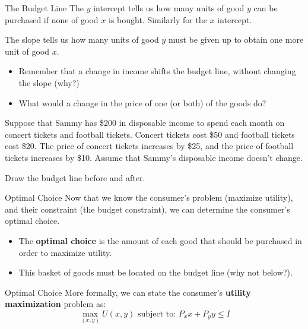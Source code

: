 \documentclass[11pt,t]{beamer}
\begin{document}
\begin{frame}{The Budget Line}
  The $y$ intercept tells us how many units of good $y$ can be purchased if none of good $x$ is bought. Similarly for the $x$ intercept.
  
  \pause\bigskip
  The slope tells us how many units of good $y$ must be given up to obtain one more unit of good $x$.

  \pause\bigskip
  \begin{itemize}
    \item Remember that a change in income shifts the budget line, without changing the slope (why?)
    
    \item What would a change in the price of one (or both) of the goods do?
  \end{itemize}
\end{frame}

\begin{frame}
  
  \bigskip
  Suppose that Sammy has \$200 in disposable income to spend each month on concert tickets and football tickets. Concert tickets cost \$50 and football tickets cost \$20. The price of concert tickets increases by \$25, and the price of football tickets increases by \$10. Assume that Sammy's disposable income doesn't change. 
  
  Draw the budget line before and after. 
\end{frame}

\begin{frame}{Optimal Choice}
  Now that we know the consumer's problem (maximize utility), and their constraint (the budget constraint), we can determine the consumer's optimal choice.
  \begin{itemize}
    \item The \textbf{optimal choice} is the amount of each good that should be purchased in order to maximize utility.

    \item This basket of goods must be located on the budget line (why not below?).
  \end{itemize}
\end{frame}

\begin{frame}{Optimal Choice}
  More formally, we can state the consumer's \textbf{utility maximization} problem as:
  $$
    \max_{(x,y)} U(x,y) \text{ subject to: } P_x x + P_y y \leq I
  $$
\end{frame}
\end{document}
